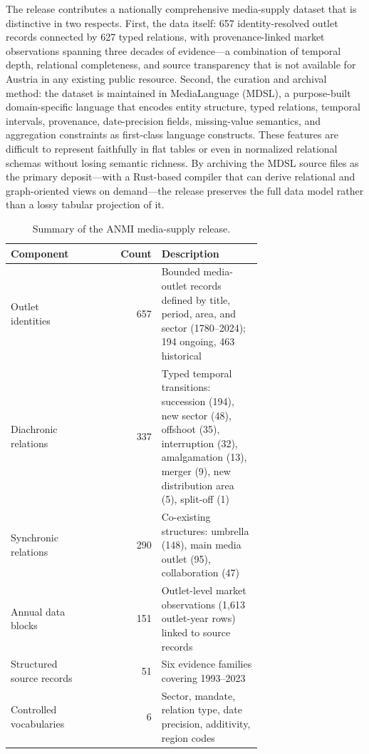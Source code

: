 \documentclass[11pt]{article}
\begin{document}
The release contributes a nationally comprehensive media-supply dataset that is distinctive in two respects. First, the data itself: 657 identity-resolved outlet records connected by 627 typed relations, with provenance-linked market observations spanning three decades of evidence---a combination of temporal depth, relational completeness, and source transparency that is not available for Austria in any existing public resource. Second, the curation and archival method: the dataset is maintained in MediaLanguage (MDSL), a purpose-built domain-specific language that encodes entity structure, typed relations, temporal intervals, provenance, date-precision fields, missing-value semantics, and aggregation constraints as first-class language constructs. These features are difficult to represent faithfully in flat tables or even in normalized relational schemas without losing semantic richness. By archiving the MDSL source files as the primary deposit---with a Rust-based compiler that can derive relational and graph-oriented views on demand---the release preserves the full data model rather than a lossy tabular projection of it.

\begin{table}[t]
  \centering
  \small
  \begin{tabular}{>{\raggedright\arraybackslash}p{0.30\linewidth}r>{\raggedright\arraybackslash}p{0.40\linewidth}}
    \toprule
    Component & Count & Description \\
    \midrule
    Outlet identities & 657 & Bounded media-outlet records defined by title, period, area, and sector (1780--2024); 194 ongoing, 463 historical \\
    Diachronic relations & 337 & Typed temporal transitions: succession (194), new sector (48), offshoot (35), interruption (32), amalgamation (13), merger (9), new distribution area (5), split-off (1) \\
    Synchronic relations & 290 & Co-existing structures: umbrella (148), main media outlet (95), collaboration (47) \\
    Annual data blocks & 151 & Outlet-level market observations (1{,}613 outlet-year rows) linked to source records \\
    Structured source records & 51 & Six evidence families covering 1993--2023 \\
    Controlled vocabularies & 6 & Sector, mandate, relation type, date precision, additivity, region codes \\
    \bottomrule
  \end{tabular}
  \caption{Summary of the ANMI media-supply release.}
  \label{tab:highlights}
\end{table}
\end{document}
